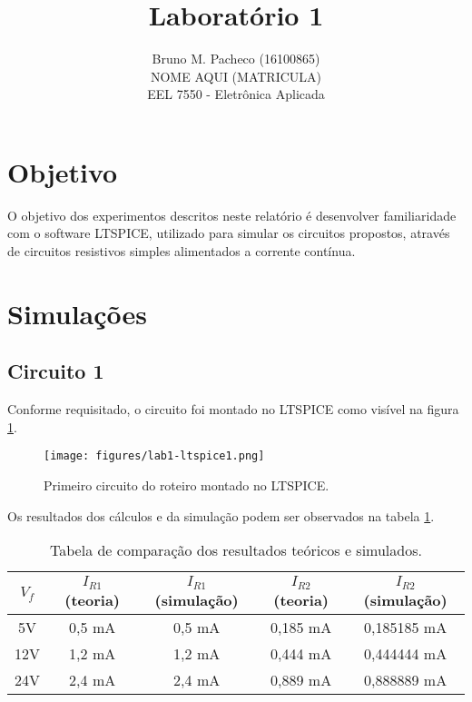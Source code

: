 \documentclass[a4paper]{report}
\begin{document}
 
\title{Laboratório 1}
\author{Bruno M. Pacheco (16100865)\\
NOME AQUI (MATRICULA) \\
EEL 7550 - Eletrônica Aplicada}
 
\maketitle

\section*{Objetivo}
 
O objetivo dos experimentos descritos neste relatório é desenvolver familiaridade com o software LTSPICE, utilizado para simular os circuitos propostos, através de circuitos resistivos simples alimentados a corrente contínua.
 
\section*{Simulações}

\subsection*{Circuito 1}

Conforme requisitado, o circuito foi montado no LTSPICE como visível na figura \ref{fig:ltspice-1}.

\begin{figure}[h]
    \centering
    \texttt{[image: figures/lab1-ltspice1.png]}
    \caption{Primeiro circuito do roteiro montado no LTSPICE.}
    \label{fig:ltspice-1}
\end{figure}

Os resultados dos cálculos e da simulação podem ser observados na tabela \ref{tab:circ-1}.

\begin{table}[h]
    \centering
    \caption{Tabela de comparação dos resultados teóricos e simulados.}
    \label{tab:circ-1}
    \begin{tabular}{c | c | c | c | c}
	$V_f$ & $I_{R1}$ (teoria) & $I_{R1}$ (simulação) & $I_{R2}$ (teoria) & $I_{R2}$ (simulação)  \\
	\hline
	5V & 0,5 mA & 0,5 mA & 0,185 mA & 0,185185 mA \\
	12V & 1,2 mA & 1,2 mA & 0,444 mA & 0,444444 mA \\
	24V & 2,4 mA & 2,4 mA & 0,889 mA & 0,888889 mA
    \end{tabular}
\end{table}
\end{document}
